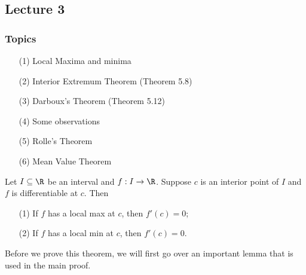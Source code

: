\subsection{Lecture 3}

\subsubsection{Topics}

\begin{enumerate}
    \item[(1)] Local Maxima and minima
    \item[(2)] Interior Extremum Theorem (Theorem 5.8)
    \item[(3)] Darboux's Theorem (Theorem 5.12)
    \item[(4)] Some observations
    \item[(5)] Rolle's Theorem
    \item[(6)] Mean Value Theorem
\end{enumerate}

\begin{theorem}\label{Theorem 5.8}
    Let \( I \subseteq  \R   \) be an interval and \( f : I \to \R  \). Suppose \( c  \) is an interior point of \( I  \) and \( f  \) is differentiable at \( c  \). Then
    \begin{enumerate}
        \item[(1)] If \( f  \) has a local max at \( c  \), then \( f'(c)  = 0 \);
        \item[(2)] If \( f  \) has a local min at \( c  \), then \( f'(c) = 0  \).
    \end{enumerate}
\end{theorem}

Before we prove this theorem, we will first go over an important lemma that is used in the main proof. 

